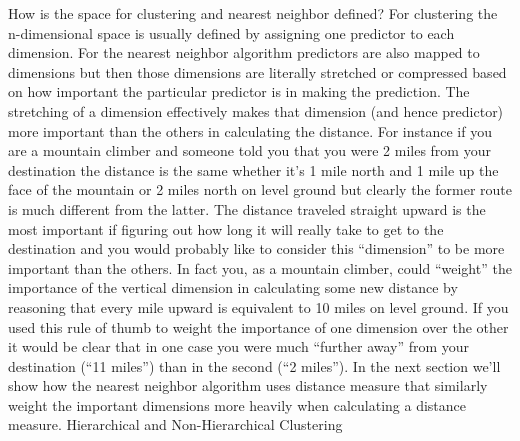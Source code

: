 How is the space for clustering and nearest neighbor defined?
For clustering the n-dimensional space is usually defined by assigning one predictor to each dimension.  For the nearest neighbor algorithm predictors are also mapped to dimensions but then those dimensions are literally stretched or compressed based on how important the particular predictor is in making the prediction.  The stretching of a dimension effectively makes that dimension (and hence predictor) more important than the others in calculating the distance.
For instance if you are a mountain climber and someone told you that you were 2 miles from your destination the distance is the same whether it’s 1 mile north and 1 mile up the face of the mountain or 2 miles north on level ground but clearly the former route is much different from the latter. The distance traveled straight upward is the most important if figuring out how long it will really take to get to the destination and you would probably like to consider this “dimension” to be more important than the others.   In fact you, as a mountain climber, could “weight” the importance of the vertical dimension in calculating some new distance by reasoning that every mile upward is equivalent to 10 miles on level ground.
If you used this rule of thumb to weight the importance of one dimension over the other it would be clear that in one case you were much “further away” from your destination (“11 miles”) than in the second (“2 miles”).  In the next section we’ll show how the nearest neighbor algorithm uses distance measure that similarly weight the important dimensions more heavily when calculating a distance measure.
Hierarchical and Non-Hierarchical Clustering

